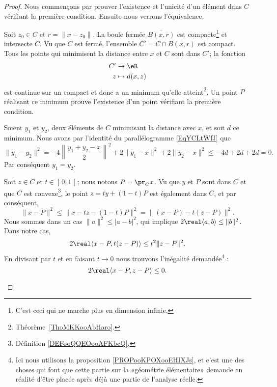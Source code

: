 \begin{proof}
	Nous commençons par prouver l'existence et l'unicité d'un élément dans \( C\) vérifiant la première condition. Ensuite nous verrons l'équivalence.

	\begin{subproof}
		\spitem[Existence]

		Soit \( z_0\in C\) et \( r=\| x-z_0 \|\). La boule fermée \( \overline{ B(x,r) }\) est compacte\footnote{C'est ceci qui ne marche plus en dimension infinie.} et intersecte \( C\). Vu que \( C\) est fermé, l'ensemble \( C'=C\cap\overline{ B(x,r) }\) est compact. Tous les points qui minimisent la distance entre \( x\) et \( C\) sont dans \( C'\); la fonction
		\begin{equation}
			\begin{aligned}
				C' & \to \eR        \\
				z  & \mapsto d(x,z)
			\end{aligned}
		\end{equation}
		est continue sur un compact et donc a un minimum qu'elle atteint\footnote{Théorème~\ref{ThoMKKooAbHaro}.}. Un point \( P\) réalisant ce minimum prouve l'existence d'un point vérifiant la première condition.

		\spitem[Unicité]
		Soient \( y_1\) et \( y_2\), deux éléments de \( C\) minimisant la distance avec \( x\), et soit \( d\) ce minimum. Nous avons par l'identité du parallélogramme \eqref{EqYCLtWfJ} que
		\begin{equation}
			\| y_1-y_2 \|^2=-4\left\| \frac{ y_1+y_2-x }{2} \right\|^2+2\| y_1-x \|^2+2\| y_2-x \|^2\leq -4d+2d+2d=0.
		\end{equation}
		Par conséquent \( y_1=y_2\).

		\spitem[\ref{zzETsfYCSItemi}\( \Rightarrow\)~\ref{zzETsfYCSItemii}]
		Soit \( z\in C\) et \( t\in \mathopen] 0 , 1 \mathclose[\); nous notons \( P=\pr_Cx\). Vu que \( y\) et \( P\) sont dans \( C\) et que \( C\) est convexe\footnote{Définition \ref{DEFooQQEOooAFKbcQ}.}, le point \( z=ty+(1-t)P\) est également dans \( C\), et par conséquent,
		\begin{equation}
			\| x-P \|^2\leq\| x-tz-(1-t)P \|^2=\| (x-P)-t(z-P) \|^2.
		\end{equation}
		Nous sommes dans un cas \( \| a \|^2\leq | a-b |^2\), qui implique \( 2\real\langle a, b\rangle \leq \| b \|^2\). Dans notre cas,
		\begin{equation}
			2\real\langle x-P , t(z-P)\rangle \leq t^2\| z-P \|^2.
		\end{equation}
		En divisant par \( t\) et en faisant \( t\to 0\) nous trouvons l'inégalité demandée\footnote{Ici nous utilisons la proposition \ref{PROPooKPOXooEHIXJs}, et c'est une des choses qui font que cette partie sur la «géométrie élémentaire» demande en réalité d'être placée après déjà une partie de l'analyse réelle.} :
		\begin{equation}
			2\real\langle x-P, z-P\rangle \leq 0.
		\end{equation}


\end{subproof}
\end{proof}
